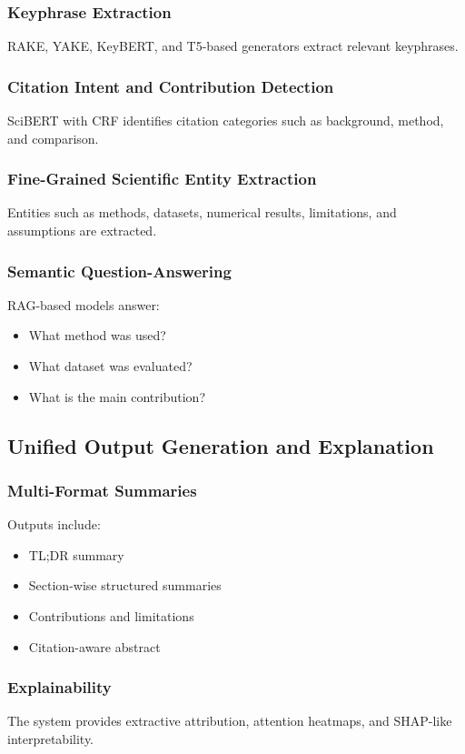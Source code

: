 \documentclass[conference]{IEEEtran}
\begin{document}
\subsubsection{Keyphrase Extraction}
RAKE, YAKE, KeyBERT, and T5-based generators extract relevant keyphrases.

\subsubsection{Citation Intent and Contribution Detection}
SciBERT with CRF identifies citation categories such as background, method, and comparison.

\subsubsection{Fine-Grained Scientific Entity Extraction}
Entities such as methods, datasets, numerical results, limitations, and assumptions are extracted.

\subsubsection{Semantic Question-Answering}
RAG-based models answer:
\begin{itemize}
    \item What method was used?
    \item What dataset was evaluated?
    \item What is the main contribution?
\end{itemize}

\subsection{Unified Output Generation and Explanation}

\subsubsection{Multi-Format Summaries}
Outputs include:
\begin{itemize}
    \item TL;DR summary
    \item Section-wise structured summaries
    \item Contributions and limitations
    \item Citation-aware abstract
\end{itemize}

\subsubsection{Explainability}
The system provides extractive attribution, attention heatmaps, and SHAP-like interpretability.
\end{document}
